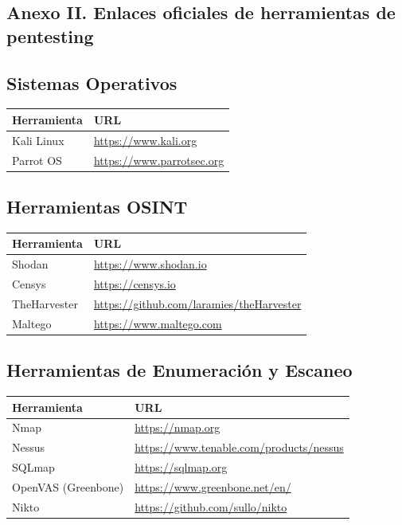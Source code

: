 \documentclass[a4paper, 11pt]{article}
\begin{document}
\subsection{Anexo II. Enlaces oficiales de herramientas de pentesting}

\subsection*{Sistemas Operativos}
\begin{table}[H]
\centering
\begin{tabular}{|m{5cm}|m{10cm}|}
\hline
\textbf{Herramienta} & \textbf{URL} \\
\hline
Kali Linux & \url{https://www.kali.org} \\
\hline
Parrot OS & \url{https://www.parrotsec.org} \\
\hline
\end{tabular}
\end{table}

\subsection*{Herramientas OSINT}
\begin{table}[H]
\centering
\begin{tabular}{|m{5cm}|m{10cm}|}
\hline
\textbf{Herramienta} & \textbf{URL} \\
\hline
Shodan & \url{https://www.shodan.io} \\
\hline
Censys & \url{https://censys.io} \\
\hline
TheHarvester & \url{https://github.com/laramies/theHarvester} \\
\hline
Maltego & \url{https://www.maltego.com} \\
\hline
\end{tabular}
\end{table}

\subsection*{Herramientas de Enumeración y Escaneo}
\begin{table}[H]
\centering
\begin{tabular}{|m{5cm}|m{10cm}|}
\hline
\textbf{Herramienta} & \textbf{URL} \\
\hline
Nmap & \url{https://nmap.org} \\
\hline
Nessus & \url{https://www.tenable.com/products/nessus} \\
\hline
SQLmap & \url{https://sqlmap.org} \\
\hline
OpenVAS (Greenbone) & \url{https://www.greenbone.net/en/} \\
\hline
Nikto & \url{https://github.com/sullo/nikto} \\
\hline
\end{tabular}
\end{table}
\end{document}
